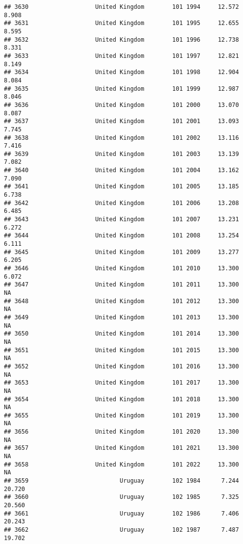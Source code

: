 \documentclass[
]{article}
\begin{document}
\begin{verbatim}
## 3630                   United Kingdom        101 1994     12.572      8.908
## 3631                   United Kingdom        101 1995     12.655      8.595
## 3632                   United Kingdom        101 1996     12.738      8.331
## 3633                   United Kingdom        101 1997     12.821      8.149
## 3634                   United Kingdom        101 1998     12.904      8.084
## 3635                   United Kingdom        101 1999     12.987      8.046
## 3636                   United Kingdom        101 2000     13.070      8.087
## 3637                   United Kingdom        101 2001     13.093      7.745
## 3638                   United Kingdom        101 2002     13.116      7.416
## 3639                   United Kingdom        101 2003     13.139      7.082
## 3640                   United Kingdom        101 2004     13.162      7.090
## 3641                   United Kingdom        101 2005     13.185      6.738
## 3642                   United Kingdom        101 2006     13.208      6.485
## 3643                   United Kingdom        101 2007     13.231      6.272
## 3644                   United Kingdom        101 2008     13.254      6.111
## 3645                   United Kingdom        101 2009     13.277      6.205
## 3646                   United Kingdom        101 2010     13.300      6.072
## 3647                   United Kingdom        101 2011     13.300         NA
## 3648                   United Kingdom        101 2012     13.300         NA
## 3649                   United Kingdom        101 2013     13.300         NA
## 3650                   United Kingdom        101 2014     13.300         NA
## 3651                   United Kingdom        101 2015     13.300         NA
## 3652                   United Kingdom        101 2016     13.300         NA
## 3653                   United Kingdom        101 2017     13.300         NA
## 3654                   United Kingdom        101 2018     13.300         NA
## 3655                   United Kingdom        101 2019     13.300         NA
## 3656                   United Kingdom        101 2020     13.300         NA
## 3657                   United Kingdom        101 2021     13.300         NA
## 3658                   United Kingdom        101 2022     13.300         NA
## 3659                          Uruguay        102 1984      7.244     20.720
## 3660                          Uruguay        102 1985      7.325     20.560
## 3661                          Uruguay        102 1986      7.406     20.243
## 3662                          Uruguay        102 1987      7.487     19.702

\end{verbatim}
\end{document}
